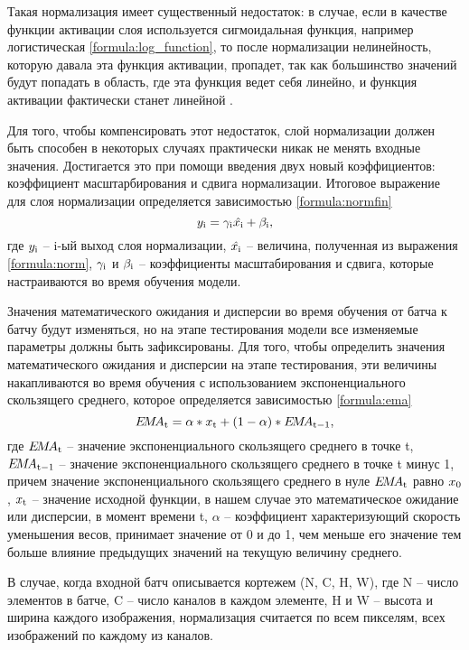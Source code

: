 Такая нормализация имеет существенный недостаток: в случае, если в качестве функции активации слоя используется сигмоидальная функция, например логистическая \ref{formula:log_function}, то после нормализации нелинейность, которую давала эта функция активации, пропадет, так как большинство значений будут попадать в область, где эта функция ведет себя линейно, и функция активации фактически станет линейной \cite{normalisation}.

Для того, чтобы компенсировать этот недостаток, слой нормализации должен быть способен в некоторых случаях практически никак не менять входные значения. Достигается это при помощи введения двух новый коэффициентов: коэффициент масштарбирования и сдвига нормализации. Итоговое выражение для слоя нормализации определяется зависимостью \ref{formula:normfin}
\begin{equation}\label{formula:normfin}
y_{\rm{i}} = \gamma_{\rm{i}}\hat{x_{\rm{i}}} + \beta_{\rm{i}},
\end{equation}
где $y_{\rm{i}}$ -- i-ый выход слоя нормализации, $\hat{x_{\rm{i}}}$ -- величина, полученная из выражения \ref{formula:norm}, $\gamma_{\rm{i}}$ и $\beta_{\rm{i}}$ -- коэффициенты масштабирования и сдвига, которые настраиваются во время обучения модели.

Значения математического ожидания и дисперсии во время обучения от батча к батчу будут изменяться, но на этапе тестирования модели все изменяемые параметры должны быть зафиксированы. Для того, чтобы определить значения математического ожидания и дисперсии на этапе тестирования, эти величины накапливаются во время обучения с использованием экспоненциального скользящего среднего, которое определяется зависимостью \ref{formula:ema} \begin{equation}\label{formula:ema}
E\!M\!A_{\rm{t}} = \alpha * x_{\rm{t}} + (1 - \alpha) * E\!M\!A_{\rm{t-1}},
\end{equation}
где $E\!M\!A_{\rm{t}}$ -- значение экспоненциального скользящего среднего в точке t, $E\!M\!A_{\rm{t-1}}$ -- значение экспоненциального скользящего среднего в точке t минус 1, причем значение экспоненциального скользящего среднего в нуле $E\!M\!A_{\rm{t}}$ равно $x_{\rm{0}}$, $x_{\rm{t}}$ -- значение исходной функции, в нашем случае это математическое ожидание или дисперсии, в момент времени t, $\alpha$ -- коэффициент характеризующий скорость уменьшения весов, принимает значение от 0 и до 1, чем меньше его значение тем больше влияние предыдущих значений на текущую величину среднего.

В случае, когда входной батч описывается кортежем (N, C, H, W), где N -- число элементов в батче, C -- число каналов в каждом элементе, H и W -- высота и ширина каждого изображения, нормализация считается по всем пикселям, всех изображений по каждому из каналов.

